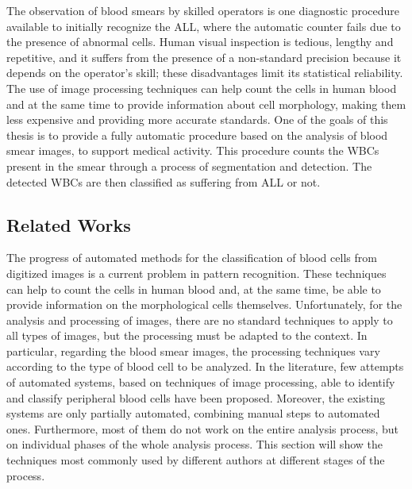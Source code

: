 \documentclass[final,a4paper,12pt,english]{UnicaPhdThesis3}
\begin{document}
The observation of blood smears by skilled operators is one diagnostic procedure available to initially recognize the ALL, where the automatic counter fails due to the presence of abnormal cells. Human visual inspection is tedious, lengthy and repetitive, and it suffers from the presence of a non-standard precision because it depends on the operator's skill; these disadvantages limit its statistical reliability. The use of image processing techniques can help count the cells in human blood and at the same time to provide information about cell morphology, making them less expensive and providing more accurate standards. One of the goals of this thesis is to provide a fully automatic procedure based on the analysis of blood smear images, to support medical activity. This procedure counts the WBCs present in the smear through a process of segmentation and detection. The detected WBCs are then classified as suffering from ALL or not. 

\subsection {Related Works}
The progress of automated methods for the classification of blood cells from digitized images is a current problem in pattern recognition. These techniques can help to count the cells in human blood and, at the same time, be able to provide information on the morphological cells themselves. Unfortunately, for the analysis and processing of images, there are no standard techniques to apply to all types of images, but the processing must be adapted to the context. In particular, regarding the blood smear images, the processing techniques vary according to the type of blood cell to be analyzed. In the literature, few attempts of automated systems, based on techniques of image processing, able to identify and classify peripheral blood cells have been proposed.
Moreover, the existing systems are only partially automated, combining manual steps to automated ones. Furthermore, most of them do not work on the entire analysis process, but on individual phases of the whole analysis process. This section will show the techniques most commonly used by different authors at different stages of the process. 
\end{document}
